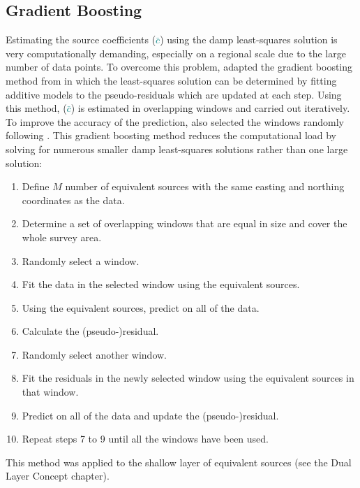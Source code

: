 \subsection{Gradient Boosting}
Estimating the source coefficients (\textcolor{teal}{$\bar{c}$}) using the damp least-squares solution is very computationally demanding, especially on a regional scale due to the large number of data points. To overcome this problem, \citet{SolerUieda2021} adapted the gradient boosting method from \citet{Friedman2001} in which the least-squares solution can be determined by fitting additive models to the pseudo-residuals which are updated at each step. Using this method, (\textcolor{teal}{$\bar{c}$}) is estimated in overlapping windows and carried out iteratively. To improve the accuracy of the prediction, \citet{SolerUieda2021} also selected the windows randomly following \citet{Friedman2002}. This gradient boosting method reduces the computational load by solving for numerous smaller damp least-squares solutions rather than one large solution:
\begin{enumerate}
    \item Define $M$ number of equivalent sources with the same easting and northing coordinates as the data.
    \item Determine a set of overlapping windows that are equal in size and cover the whole survey area.
    \item Randomly select a window.
    \item Fit the data in the selected window using the equivalent sources.
    \item Using the equivalent sources, predict on all of the data.
    \item Calculate the (pseudo-)residual.
    \item Randomly select another window.
    \item Fit the residuals in the newly selected window using the equivalent sources in that window.
    \item Predict on all of the data and update the (pseudo-)residual.
    \item Repeat steps 7 to 9 until all the windows have been used.
\end{enumerate}
This method was applied to the shallow layer of equivalent sources (see the Dual Layer Concept chapter).

